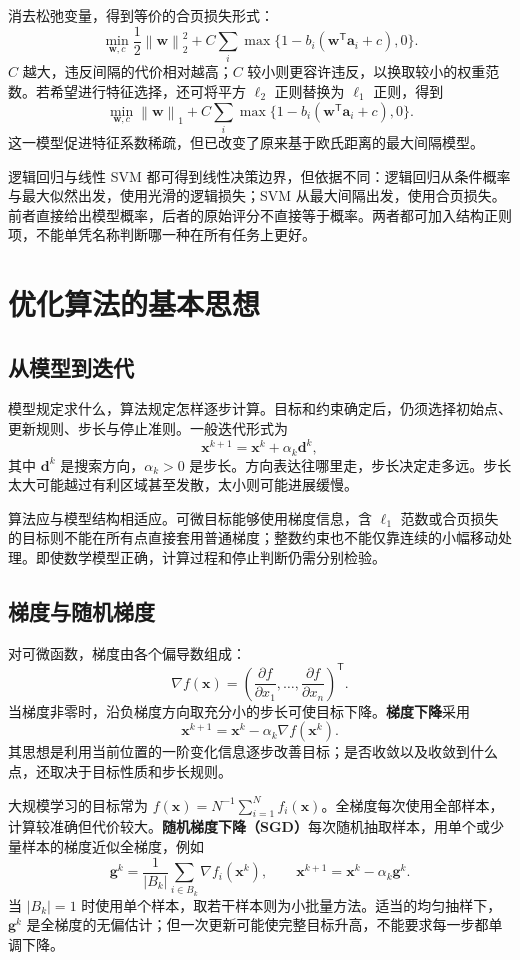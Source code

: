 \documentclass[UTF8,fontset=fandol,a4paper,12pt]{ctexart}
\newcommand{\vx}{\boldsymbol x}
\newcommand{\va}{\boldsymbol a}
\newcommand{\vw}{\boldsymbol w}
\newcommand{\norm}[1]{\left\lVert#1\right\rVert}
\theoremstyle{definition}
\begin{document}
消去松弛变量，得到等价的合页损失形式：
\[
 \min_{\vw,c}\frac12\norm{\vw}_2^2
 +C\sum_i\max\{1-b_i(\vw^{\mathsf T}\va_i+c),0\}.
\]
$C$ 越大，违反间隔的代价相对越高；$C$ 较小则更容许违反，以换取较小的权重范数。若希望进行特征选择，还可将平方 $\ell_2$ 正则替换为 $\ell_1$ 正则，得到
\[
 \min_{\vw,c}\norm{\vw}_1
 +C\sum_i\max\{1-b_i(\vw^{\mathsf T}\va_i+c),0\}.
\]
这一模型促进特征系数稀疏，但已改变了原来基于欧氏距离的最大间隔模型。

逻辑回归与线性 SVM 都可得到线性决策边界，但依据不同：逻辑回归从条件概率与最大似然出发，使用光滑的逻辑损失；SVM 从最大间隔出发，使用合页损失。前者直接给出模型概率，后者的原始评分不直接等于概率。两者都可加入结构正则项，不能单凭名称判断哪一种在所有任务上更好。

\section{优化算法的基本思想}
\subsection{从模型到迭代}
模型规定求什么，算法规定怎样逐步计算。目标和约束确定后，仍须选择初始点、更新规则、步长与停止准则。一般迭代形式为
\[
 \vx^{k+1}=\vx^k+\alpha_k\boldsymbol d^k,
\]
其中 $\boldsymbol d^k$ 是搜索方向，$\alpha_k>0$ 是步长。方向表达往哪里走，步长决定走多远。步长太大可能越过有利区域甚至发散，太小则可能进展缓慢。

算法应与模型结构相适应。可微目标能够使用梯度信息，含 $\ell_1$ 范数或合页损失的目标则不能在所有点直接套用普通梯度；整数约束也不能仅靠连续的小幅移动处理。即使数学模型正确，计算过程和停止判断仍需分别检验。

\subsection{梯度与随机梯度}
对可微函数，梯度由各个偏导数组成：
\[
 \nabla f(\vx)=\left(\frac{\partial f}{\partial x_1},\ldots,
 \frac{\partial f}{\partial x_n}\right)^{\mathsf T}.
\]
当梯度非零时，沿负梯度方向取充分小的步长可使目标下降。\textbf{梯度下降}采用
\[
 \boxed{\vx^{k+1}=\vx^k-\alpha_k\nabla f(\vx^k).}
\]
其思想是利用当前位置的一阶变化信息逐步改善目标；是否收敛以及收敛到什么点，还取决于目标性质和步长规则。

大规模学习的目标常为 $f(\vx)=N^{-1}\sum_{i=1}^N f_i(\vx)$。全梯度每次使用全部样本，计算较准确但代价较大。\textbf{随机梯度下降（SGD）}每次随机抽取样本，用单个或少量样本的梯度近似全梯度，例如
\[
 \boldsymbol g^k=\frac1{|B_k|}\sum_{i\in B_k}\nabla f_i(\vx^k),\qquad
 \vx^{k+1}=\vx^k-\alpha_k\boldsymbol g^k.
\]
当 $|B_k|=1$ 时使用单个样本，取若干样本则为小批量方法。适当的均匀抽样下，$\boldsymbol g^k$ 是全梯度的无偏估计；但一次更新可能使完整目标升高，不能要求每一步都单调下降。
\end{document}
